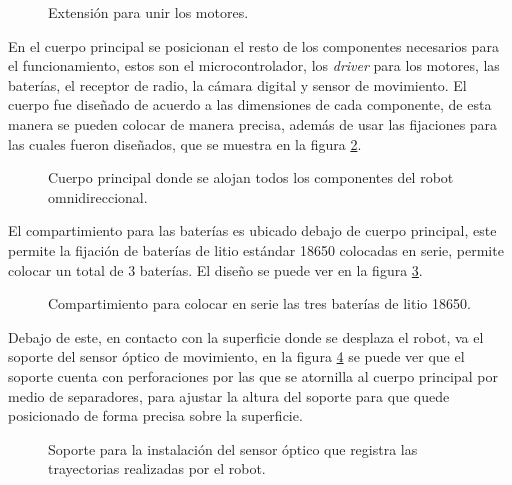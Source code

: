 \documentclass{iccmemoria}
\begin{document}
\begin{figure}[H]
  \centering
  
  \caption[Extensión para unir los motores.]{Extensión para unir los motores.}
  \label{fig:arm}
\end{figure}

En el cuerpo principal se posicionan el resto de los componentes necesarios para el funcionamiento, estos son el microcontrolador, los \emph{driver} para los motores, las baterías, el receptor de radio, la cámara digital y sensor de movimiento. El cuerpo fue diseñado de acuerdo a las dimensiones de cada componente, de esta manera se pueden colocar de manera precisa, además de usar las fijaciones para las cuales fueron diseñados, que se muestra en la figura \ref{fig:frame}.\\

\begin{figure}[H]
  \centering
  
  \caption[Cuerpo principal robot omnidireccional.]{Cuerpo principal donde se alojan todos los componentes del robot omnidireccional.}
  \label{fig:frame}
\end{figure}

El compartimiento para las baterías es ubicado debajo de cuerpo principal, este permite la fijación de baterías de litio estándar 18650 colocadas en serie, permite colocar un total de 3 baterías. El diseño se puede ver en la figura \ref{fig:battery_compartment}.

\begin{figure}[H]
  \centering
  
  \caption[Compartimiento de baterías.]{Compartimiento para colocar en serie las tres baterías de litio 18650.}
  \label{fig:battery_compartment}
\end{figure}

Debajo de este, en contacto con la superficie donde se desplaza el robot, va el soporte del sensor óptico de movimiento, en la figura \ref{fig:mouse_holder} se puede ver que el soporte cuenta con perforaciones por las que se atornilla al cuerpo principal por medio de separadores, para ajustar la altura del soporte para que quede posicionado de forma precisa sobre la superficie.\\

\begin{figure}[H]
  \centering
  
  \caption[Soporte sensor óptico.]{Soporte para la instalación del sensor óptico que registra las trayectorias realizadas por el robot.}
  \label{fig:mouse_holder}
\end{figure}
\end{document}
